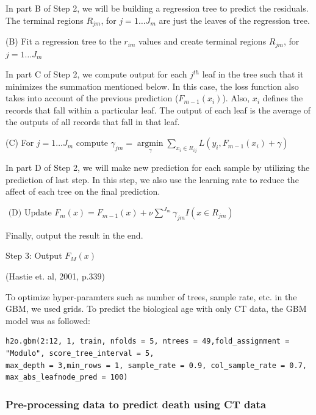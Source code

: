 \documentclass{article}
\begin{document}
In part B of Step 2, we will be building a regression tree to predict the residuals. The terminal regions $R_{j m}$, for $j=1 \ldots J_{m}$ are just the leaves of the regression tree.

\hspace*{10mm}(B) Fit a regression tree to the $r_{i m}$ values and create terminal regions $R_{j m}$, for $j=1 \ldots J_{m}$

In part C of Step 2, we compute output for each $j^{th}$ leaf in the tree such that it minimizes the summation mentioned below. In this case, the loss function also takes into account of the previous prediction ($F_{m-1}\left(x_{i}\right)$). Also, $x_{i}$ defines the records that fall within a particular leaf. The output of each leaf is the average of the outputs of all records that fall in that leaf.

\hspace*{10mm}(C) For $j=1 \ldots J_{m}$ compute $\gamma_{j m}=\underset{\gamma}{\operatorname{argmin}} \sum_{x_{i} \in R_{i j}} L\left(y_{i}, F_{m-1}\left(x_{i}\right)+\gamma\right)$

In part D of Step 2, we will make new prediction for each sample by utilizing the prediction of last step. In this step, we also use the learning rate to reduce the affect of each tree on the final prediction.

\hspace*{10mm}$\text { (D) Update } F_{m}(x)=F_{m-1}(x)+\nu \sum^{J_{m}} \gamma_{j m} I\left(x \in R_{j m}\right)$

Finally, output the result in the end. 

\hspace*{10mm}Step 3: Output $F_{M}(x)$

(Hastie et. al, 2001, p.339)

To optimize hyper-paramters such as number of trees, sample rate, etc. in the GBM, we used grids. To predict the biological age with only CT data, the GBM model was as followed:

\begin{verbatim}
h2o.gbm(2:12, 1, train, nfolds = 5, ntrees = 49,fold_assignment = "Modulo", score_tree_interval = 5, 
max_depth = 3,min_rows = 1, sample_rate = 0.9, col_sample_rate = 0.7, max_abs_leafnode_pred = 100)
\end{verbatim}



\subsubsection{Pre-processing data to predict death using CT data}
\end{document}
